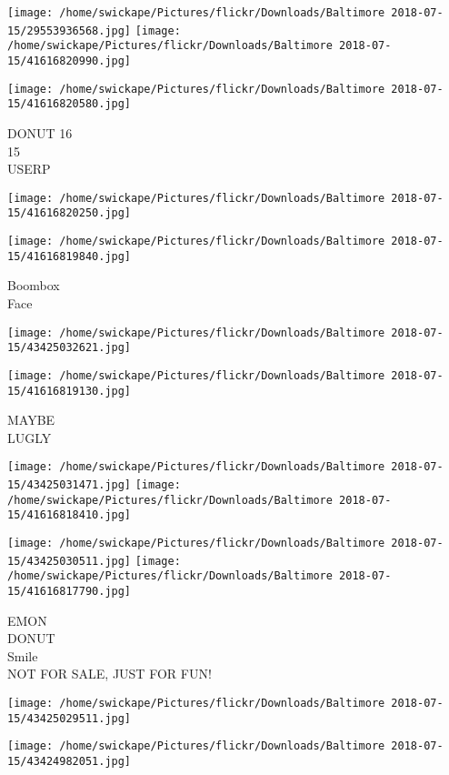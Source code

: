 \documentclass[10pt,letterpaper]{article}
\begin{document}
\texttt{[image: /home/swickape/Pictures/flickr/Downloads/Baltimore 2018-07-15/29553936568.jpg]}
\texttt{[image: /home/swickape/Pictures/flickr/Downloads/Baltimore 2018-07-15/41616820990.jpg]}

\vspace{0.25in}
\texttt{[image: /home/swickape/Pictures/flickr/Downloads/Baltimore 2018-07-15/41616820580.jpg]}

DONUT 16\\
15\\
USERP
\pagebreak

\texttt{[image: /home/swickape/Pictures/flickr/Downloads/Baltimore 2018-07-15/41616820250.jpg]}

\vspace{0.25in}
\texttt{[image: /home/swickape/Pictures/flickr/Downloads/Baltimore 2018-07-15/41616819840.jpg]}

Boombox\\
Face
\pagebreak

\texttt{[image: /home/swickape/Pictures/flickr/Downloads/Baltimore 2018-07-15/43425032621.jpg]}

\vspace{0.25in}
\texttt{[image: /home/swickape/Pictures/flickr/Downloads/Baltimore 2018-07-15/41616819130.jpg]}

MAYBE\\
LUGLY
\pagebreak

\texttt{[image: /home/swickape/Pictures/flickr/Downloads/Baltimore 2018-07-15/43425031471.jpg]}
\texttt{[image: /home/swickape/Pictures/flickr/Downloads/Baltimore 2018-07-15/41616818410.jpg]}

\texttt{[image: /home/swickape/Pictures/flickr/Downloads/Baltimore 2018-07-15/43425030511.jpg]}
\texttt{[image: /home/swickape/Pictures/flickr/Downloads/Baltimore 2018-07-15/41616817790.jpg]}

EMON\\
DONUT\\
Smile\\
NOT FOR SALE, JUST FOR FUN!
\pagebreak

\texttt{[image: /home/swickape/Pictures/flickr/Downloads/Baltimore 2018-07-15/43425029511.jpg]}

\vspace{0.25in}
\texttt{[image: /home/swickape/Pictures/flickr/Downloads/Baltimore 2018-07-15/43424982051.jpg]}
\end{document}
